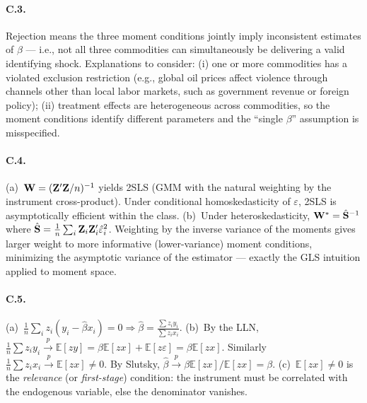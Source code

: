 \documentclass{article}
\newcommand{\E}{\mathbb{E}}
\newcommand{\pconv}{\xrightarrow{p}}
\begin{document}
\paragraph{C.3.}  Rejection means the three moment conditions jointly imply inconsistent estimates of $\beta$ --- i.e., not all three commodities can simultaneously be delivering a valid identifying shock.  Explanations to consider: (i) one or more commodities has a violated exclusion restriction (e.g., global oil prices affect violence through channels other than local labor markets, such as government revenue or foreign policy); (ii) treatment effects are heterogeneous across commodities, so the moment conditions identify different parameters and the ``single $\beta$'' assumption is misspecified.

\paragraph{C.4.}  (a)~${\mathbf W} = ({\mathbf Z}'{\mathbf Z}/n)^{-1}$ yields 2SLS (GMM with the natural weighting by the instrument cross-product).  Under conditional homoskedasticity of $\varepsilon$, 2SLS is asymptotically efficient within the class.  (b)~Under heteroskedasticity, ${\mathbf W}^* = \hat{{\mathbf S}}^{-1}$ where $\hat{{\mathbf S}} = \frac{1}{n}\sum_i {\mathbf Z}_i{\mathbf Z}_i'\hat\varepsilon_i^2$.  Weighting by the inverse variance of the moments gives larger weight to more informative (lower-variance) moment conditions, minimizing the asymptotic variance of the estimator --- exactly the GLS intuition applied to moment space.

\paragraph{C.5.}  (a)~$\frac{1}{n}\sum_i z_i(y_i - \hat\beta x_i) = 0 \Rightarrow \hat\beta = \frac{\sum z_i y_i}{\sum z_i x_i}$.  (b)~By the LLN, $\frac{1}{n}\sum z_i y_i \pconv \E[zy] = \beta\E[zx] + \E[z\varepsilon] = \beta\E[zx]$.  Similarly $\frac{1}{n}\sum z_i x_i \pconv \E[zx] \neq 0$.  By Slutsky, $\hat\beta \pconv \beta\E[zx]/\E[zx] = \beta$.  (c)~$\E[zx] \neq 0$ is the \emph{relevance} (or \emph{first-stage}) condition: the instrument must be correlated with the endogenous variable, else the denominator vanishes.
\end{document}
